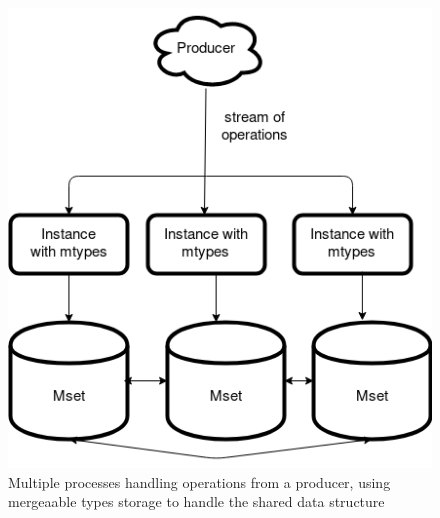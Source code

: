 \documentclass{article}
\begin{document}
\begin{figure}[ht]
\centering
\caption{Multiple processes handling operations from a producer, using mergeaable types storage to handle the shared data structure}
\includegraphics[width=0.3\textheight]{benchmark-mtyped.png}
\end{figure}

\newpage


\end{document}
